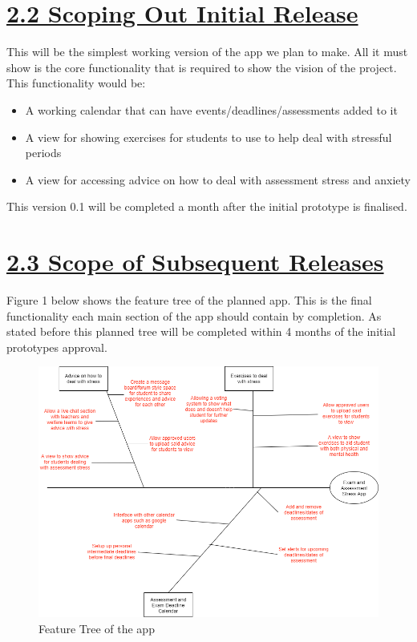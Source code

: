 \documentclass[a4paper]{article}
\begin{document}
\section*{\underline{2.2 Scoping Out Initial Release}}
This will be the simplest working version of the app we plan to make. All it must show is the core functionality that is required to show the vision of the project. This functionality would be:
\begin{itemize}
	\item A working calendar that can have events/deadlines/assessments added to it
	\item A view for showing exercises for students to use to help deal with stressful periods
	\item A view for accessing advice on how to deal with assessment stress and anxiety
\end{itemize}

This version 0.1 will be completed a month after the initial prototype is finalised. 
\pagebreak

\section*{\underline{2.3 Scope of Subsequent Releases}}
Figure 1 below shows the feature tree of the planned app. This is the final functionality each main section of the app should contain by completion. As stated before this planned tree will be completed within 4 months of the initial prototypes approval.

\begin{figure}[h!]
	\includegraphics[scale=0.5]{FeatureTree.png}
	\caption{Feature Tree of the app}
	\label{fig:FeatureTree}
\end{figure}
\end{document}
